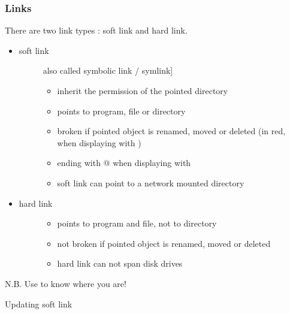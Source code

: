 \documentclass[letterpaper,10pt,english]{sphinxmanual}
\begin{document}
\subsubsection{Links}
\label{system/linux/admin:links}
There are two link types : soft link and hard link.
\begin{itemize}
\item {} \begin{description}
\item[{soft link}] \leavevmode{[}also called symbolic link / symlink{]}\begin{itemize}
\item {} 
inherit the permission of the pointed directory

\item {} 
points to program, file or directory

\item {} 
broken if pointed object is renamed, moved or deleted (in red, when displaying with )

\item {} 
ending with @ when displaying with 

\item {} 
soft link can point to a network mounted directory

\end{itemize}

\end{description}

\item {} \begin{description}
\item[{hard link}] \leavevmode\begin{itemize}
\item {} 
points to program and file, not to directory

\item {} 
not broken if pointed object is renamed, moved or deleted

\item {} 
hard link can not span disk drives

\end{itemize}

\end{description}

\end{itemize}

N.B. Use  to know where you are!

Updating soft link
\end{document}
